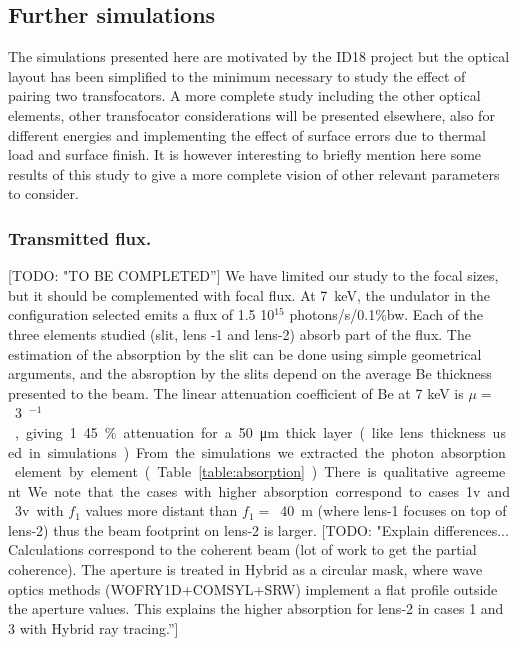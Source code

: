 \documentclass{iucr}              %
\newcommand{\todo}[1]{{\color{red}[TODO: "#1'']}}
\begin{document}
\subsection{Further simulations}

The simulations presented here are motivated by the ID18 project but the optical layout has been simplified to the minimum necessary to study the effect of pairing two transfocators. A more complete study including the other optical elements, other transfocator considerations will be presented elsewhere, also for different energies and implementing the effect of surface errors due to thermal load and surface finish. It is however interesting to briefly mention here some results of this study to give a more complete vision of other relevant parameters to consider.

\subsubsection{Transmitted flux.} \todo{TO BE COMPLETED} We have limited our study to the focal sizes, but it should be complemented with focal flux. At \SI{7}{keV}, the undulator in the configuration selected emits a flux of 1.5 10$^{15}$ photons/s/0.1\%bw. Each of the three elements studied (slit, lens -1 and lens-2) absorb part of the flux. The estimation of the absorption by the slit can be done using simple geometrical arguments, and the absroption by the slits depend on the average Be thickness presented to the beam. The linear attenuation coefficient of Be at 7 keV is $\mu=$~\SI{3}{\centi\meter$^{-1}$}, giving 1.45\% attenuation for a \SI{50}{\micro\meter} thick layer (like lens thickness used in simulations). From the simulations we extracted the photon absorption element by element (Table~\ref{table:absorption}). There is qualitative agreement. We note that the cases with higher absorption correspond to cases 1v and 3v with $f_1$ values more distant than $f_1=$~\SI{40}{m} (where lens-1 focuses on top of lens-2) thus the beam footprint on lens-2 is larger. \todo{Explain differences...
Calculations correspond to the coherent beam (lot of work to get the partial coherence). The aperture is treated in Hybrid as a circular mask, where wave optics methods (WOFRY1D+COMSYL+SRW) implement a flat profile outside the aperture values. This explains the higher absorption for lens-2 in cases 1 and 3 with Hybrid ray tracing.}  
\end{document}
